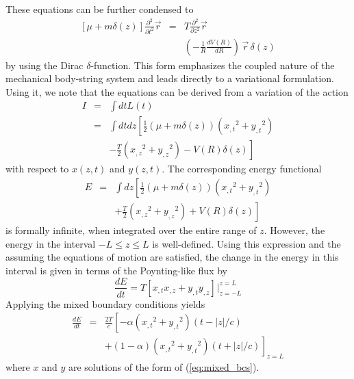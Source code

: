 These equations can be further condensed to 
\begin{eqnarray}\label{eq:equ_motion}
    \left[ \mu + m \delta (z) \right] \frac{\partial ^2}{\partial t^2} {\vec r}
& = &  T \frac{\partial ^2}{\partial z^2}{\vec r} \nonumber \\
&   & \left(-\frac{1}{R} \frac{d V(R)}{d R} \right) 
      \, {\vec r} \, \delta (z)
\end{eqnarray}
by using the Dirac $\delta$-function.  
This form emphasizes the coupled nature of the mechanical 
body-string system and leads directly to a variational formulation.  
Using it, we note that the equations can be 
derived from a variation of the action
\begin{eqnarray}
  I & = & \int dt L(t) \nonumber \\ 
    & = & \int dt dz 
      \left[
	    \frac{1}{2}
	    \left(\mu + m \delta(z)\right)
        \left( {x_{,t}}^2 + {y_{,t}}^2 \right) \right. \nonumber \\
	&   &
		\left.
	   -\frac{T}{2} \left( {x_{,z}}^2 + {y_{,z}}^2 \right)
       - V(R) \delta(z)
  	  \right]
\end{eqnarray}
with respect to $x(z,t)$ and $y(z,t)$.
The corresponding energy functional
\begin{eqnarray}
  E & = & \int dz 
      \left[
	    \frac{1}{2}
	    \left(\mu + m \delta(z)\right)
        \left( {x_{,t}}^2 + {y_{,t}}^2 \right) \right. \nonumber \\
	&   &
		\left.
	   +\frac{T}{2} \left( {x_{,z}}^2 + {y_{,z}}^2 \right)
       + V(R) \delta(z)
  	  \right]
\end{eqnarray}
is formally infinite, when integrated over the entire range of $z$.
However, the energy in the interval $-L \leq z \leq L$ is 
well-defined.  
Using this expression and the assuming the equations of motion 
are satisfied, the change in the energy in this interval is given 
in terms of the Poynting-like flux by
\[
\frac{dE}{dt} = T \left[x_{,t} x_{,z} + y_{,t} y_{,z}\right]{\left.{}^{} \right|}_{z=-L}^{z=L}	
\]
Applying the mixed boundary conditions yields
\begin{eqnarray}\label{eq:Poynt_1}
\frac{dE}{dt} & = &  \frac{2T}{c}\left[ -\alpha
                                               \left( {x_{,t}}^2 + {y_{,t}}^2 \right)
                                                     (t - |z|/c)
								  \right. \nonumber \\
			  &   & 			+ 
			                      \left. 
								   (1 - \alpha) \left( {x_{,t}}^2 + {y_{,t}}^2 \right)
								                     (t + |z|/c)
							\right]_{z=L}
\end{eqnarray}
where $x$ and $y$ are solutions of the form of 
(\ref{eq:mixed_bcs}).


